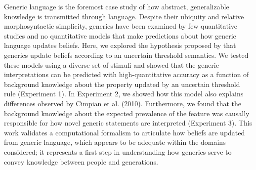\documentclass[floatsintext,man]{apa6}
\begin{document}
Generic language is the foremost case study of how abstract, generalizable knowledge is transmitted through language.
Despite their ubiquity and relative morphosyntactic simplicity, generics have been examined by few quantitative studies and no quantitative models that make predictions about how generic language updates beliefs.
Here, we explored the hypothesis proposed by  that generics update beliefs according to an uncertain threshold semantics. 
We tested these models using a diverse set of stimuli and showed that the generic interpretations can be predicted with high-quantitative accuracy as a function of background knowledge about the property updated by an uncertain threshold rule (Experiment 1).
In Experiment 2, we showed how this model also explains differences observed by Cimpian et al. (2010).
Furthermore, we found that the background knowledge about the expected prevalence of the feature was causally responsible for how novel generic statements are interpreted (Experiment 3).
This work validates a computational formalism to articulate how beliefs are updated from generic language, which appears to be adequate within the domains considered; it represents a first step in understanding how generics serve to convey knowledge between people and generations.
\end{document}

